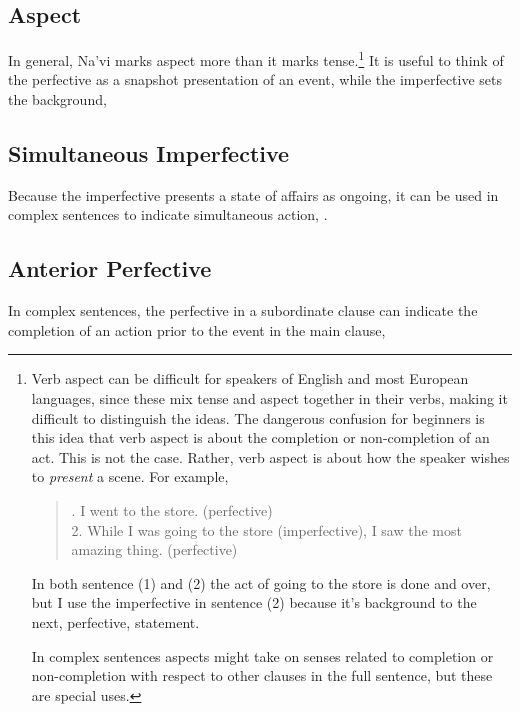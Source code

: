 \subsection{Aspect} In general, Na'vi marks aspect more than it marks
tense.\footnote{Verb aspect can be difficult for speakers of English
and most European languages, since these mix tense and aspect
together in their verbs, making it difficult to distinguish the
ideas.  The dangerous confusion for beginners is this idea that verb
aspect is about the completion or non-completion of an act.  This is
not the case.  Rather, verb aspect is about how the speaker wishes to
\textit{present} a scene.  For example,

\begin{quotation}
.  I went to the store.  (perfective)\\
2.  While I was going to the store (imperfective), I saw the most amazing thing. (perfective)
\end{quotation}
In both sentence (1) and (2) the act of going to the store is done
and over, but I use the imperfective in sentence (2) because
it's background to the next, perfective, statement.

In complex sentences aspects might take on senses related to
completion or non-completion with respect to other clauses in the full
sentence, but these are special uses.}  It is useful to think of the
perfective as a snapshot presentation of an event, while the
imperfective sets the background,  

\subsection{Simultaneous Imperfective} Because the imperfective
presents a state of affairs as on\-going, it can be used in complex
sentences to indicate simultaneous action,  .

\subsection{Anterior Perfective} In complex sentences, the perfective
in a subordinate clause can indicate the completion of an action prior
to the event in the main clause, 

